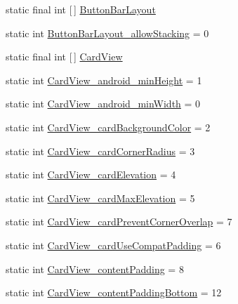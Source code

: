 \begin{DoxyCompactItemize}
\item 
static final int \mbox{[}$\,$\mbox{]} \hyperlink{classandroid_1_1support_1_1v7_1_1mediarouter_1_1R_1_1styleable_a593f0c0986a9c8a483e9872a27fb061d}{Button\+Bar\+Layout}
\item 
static int \hyperlink{classandroid_1_1support_1_1v7_1_1mediarouter_1_1R_1_1styleable_a7e4d2a0c7ab7cdbb0c587c661f3eed1d}{Button\+Bar\+Layout\+\_\+allow\+Stacking} = 0
\item 
static final int \mbox{[}$\,$\mbox{]} \hyperlink{classandroid_1_1support_1_1v7_1_1mediarouter_1_1R_1_1styleable_a58720bc744e6374c25e81b8ae15a2c6a}{Card\+View}
\item 
static int \hyperlink{classandroid_1_1support_1_1v7_1_1mediarouter_1_1R_1_1styleable_afafa22bc1b39275635e284eb80eb592a}{Card\+View\+\_\+android\+\_\+min\+Height} = 1
\item 
static int \hyperlink{classandroid_1_1support_1_1v7_1_1mediarouter_1_1R_1_1styleable_ae04c8a88a10b869c611ced6fea6170ca}{Card\+View\+\_\+android\+\_\+min\+Width} = 0
\item 
static int \hyperlink{classandroid_1_1support_1_1v7_1_1mediarouter_1_1R_1_1styleable_ac8c7dbc2ce6622ee6fd96993e974ed28}{Card\+View\+\_\+card\+Background\+Color} = 2
\item 
static int \hyperlink{classandroid_1_1support_1_1v7_1_1mediarouter_1_1R_1_1styleable_a548412d8d96cee090ee611a2476521d0}{Card\+View\+\_\+card\+Corner\+Radius} = 3
\item 
static int \hyperlink{classandroid_1_1support_1_1v7_1_1mediarouter_1_1R_1_1styleable_ac95f8abaff3bbe9cdf203343d4259207}{Card\+View\+\_\+card\+Elevation} = 4
\item 
static int \hyperlink{classandroid_1_1support_1_1v7_1_1mediarouter_1_1R_1_1styleable_ae32cba2f19b8ed4678602f08eb2cf8a9}{Card\+View\+\_\+card\+Max\+Elevation} = 5
\item 
static int \hyperlink{classandroid_1_1support_1_1v7_1_1mediarouter_1_1R_1_1styleable_a454848c21083964d3e8349b51be1943e}{Card\+View\+\_\+card\+Prevent\+Corner\+Overlap} = 7
\item 
static int \hyperlink{classandroid_1_1support_1_1v7_1_1mediarouter_1_1R_1_1styleable_a60a82a1904d0a54f4044b392f62eecfb}{Card\+View\+\_\+card\+Use\+Compat\+Padding} = 6
\item 
static int \hyperlink{classandroid_1_1support_1_1v7_1_1mediarouter_1_1R_1_1styleable_af7ef5322522613934b0e313cc0c155b6}{Card\+View\+\_\+content\+Padding} = 8
\item 
static int \hyperlink{classandroid_1_1support_1_1v7_1_1mediarouter_1_1R_1_1styleable_a777878e2a53c120829fa76dfd7786c17}{Card\+View\+\_\+content\+Padding\+Bottom} = 12

\end{DoxyCompactItemize}

